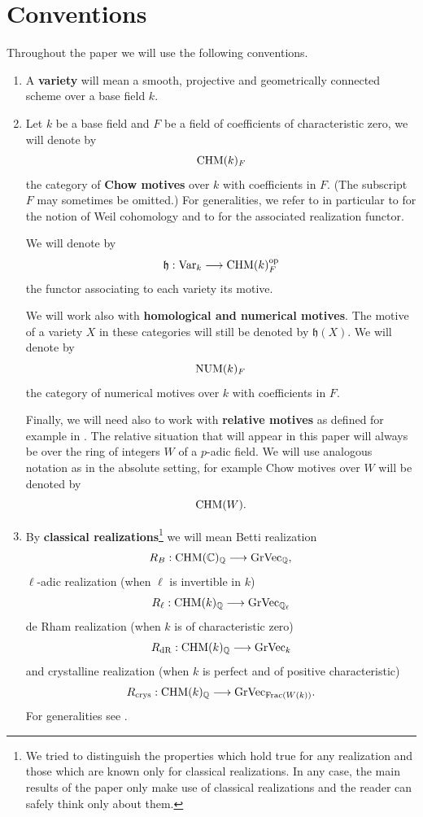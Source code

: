 \documentclass[11pt]{amsart}
\begin{document}
\section{Conventions}
Throughout the paper we will use the following conventions.
\begin{enumerate}
\item  A \textbf{variety} will mean a smooth, projective and geometrically connected scheme over a base  field  $k$. 



\item Let  $k$ be a base field and $F$ be a field of coefficients of characteristic zero, we will denote by \[\mathrm{CHM}(k)_{F}\] the category of  \textbf{Chow motives} over $k$ with coefficients in $F$. (The subscript $F$ may sometimes be omitted.) For generalities, we refer to \cite{Andmot} in particular to \cite[Definition 3.3.1.1]{Andmot}  for the notion of Weil cohomology and to \cite[Proposition 4.2.5.1]{Andmot}  for the associated realization functor. 

We will denote by
\[\mathfrak{h} : \textnormal{Var}_k\longrightarrow \mathrm{CHM}(k)_{F}^{\textnormal{op}}\]
the functor associating to each variety its motive.

We will work also with \textbf{homological and numerical motives}. The motive of a variety $X$ in these categories will still be denoted by $\mathfrak{h} (X)$. We will denote by 
\[\mathrm{NUM}(k)_F\]
the category of numerical motives over $k$ with coefficients in $F$. 

Finally, we will need also to work with  \textbf{relative motives} as defined for example in \cite[\S 5.1]{OS2}.  The relative situation that will appear in this paper will always be over the ring of integers $W$ of a $p$-adic field. We will use analogous notation as in the absolute setting, for example Chow motives over $W$ will be denoted by \[\mathrm{CHM}(W).\]

\item By \textbf{classical realizations}\footnote{We tried to distinguish the properties which hold true for any realization and those which are known only for classical realizations.  In any case, the main results of the paper only make use of classical realizations and the reader can safely think only about them.} we will mean Betti realization
\[R_B : \mathrm{CHM}(\mathbb{C})_{\mathbb{Q}}\longrightarrow \textnormal{GrVec}_{\mathbb{Q}},\]
  $\ell$-adic realization (when $\ell$ is invertible in $k$)
\[R_\ell : \mathrm{CHM}(k)_{\mathbb{Q}}\longrightarrow \textnormal{GrVec}_{\mathbb{Q}_\ell}\]
 de Rham realization (when $k$ is of characteristic zero)
\[R_{\mathrm{dR}} : \mathrm{CHM}(k)_{\mathbb{Q}}\longrightarrow \textnormal{GrVec}_{k}\]
and crystalline realization (when $k$ is perfect and of positive characteristic)
\[R_{\textnormal{crys}} : \mathrm{CHM}(k)_{\mathbb{Q}}\longrightarrow \textnormal{GrVec}_{\mathrm{Frac} (W(k))}.\]
 For generalities see  \cite[\S 3.4.2 and Proposition 4.2.5.1]{Andmot}.



\end{enumerate}
\end{document}
